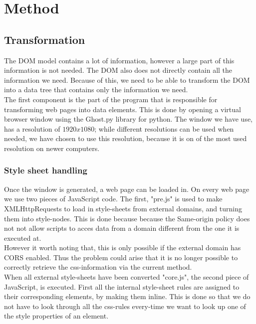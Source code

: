 \chapter{Method}\label{method}

\section{Transformation}
The DOM model contains a lot of information, however a large part of this information is not needed. The DOM also does not directly contain all the information we need. Because of this, we need to be able to transform the DOM into a data tree that contains only the information we need.
\\The first component is the part of the program that is responsible for transforming web pages into data elements. This is done by opening a virtual browser window using the Ghost.py library for python. The window we have use, has a resolution of $1920x1080$; while different resolutions can be used when needed, we have chosen to use this resolution, because it is on of the most used resolution on newer computers.
\subsection{Style sheet handling}
Once the window is generated, a web page can be loaded in. On every web page we use two pieces of JavaScript code. The first, "pre.js" is used to make XMLHttpRequests to load in style-sheets from external domains, and turning them into style-nodes. This is done because because the Same-origin policy does not not allow scripts to acces data from a domain different from the one it is executed at.
\\However it worth noting that, this is only possible if the external domain has CORS enabled. Thus the problem could arise that it is no longer possible to correctly retrieve the css-information via the current method.
\\When all external style-sheets have been converted "core.js", the second piece of JavaScript, is executed. First all the internal style-sheet rules are assigned to their corresponding elements, by making them inline. This is done so that we do not have to look through all the css-rules every-time we want to look up one of the style properties of an element.

